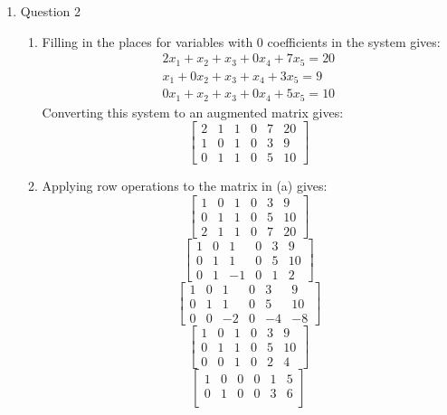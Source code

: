 \documentclass{article}
\begin{document}
\begin{enumerate}
    \newpage 
    \item Question 2
    \begin{enumerate}
        \item Filling in the places for variables with 0 coefficients in the system gives:
        \begin{align*}
            2x_1 + x_2 + x_3 + 0x_4 + 7x_5 = 20 \\
            x_1 + 0x_2 + x_3 + x_4 + 3x_5 = 9 \\
            0x_1 + x_2 + x_3 + 0x_4 + 5x_5 = 10
        \end{align*}
        Converting this system to an augmented matrix gives:
        $$\begin{bmatrix}
            2 & 1 & 1 & 0 & 7 & 20 \\
            1 & 0 & 1 & 0 & 3 & 9 \\
            0 & 1 & 1 & 0 & 5 & 10
        \end{bmatrix}$$
        \item Applying row operations to the matrix in (a) gives:
        $$\begin{bmatrix}
            1 & 0 & 1 & 0 & 3 & 9 \\
            0 & 1 & 1 & 0 & 5 & 10 \\
            2 & 1 & 1 & 0 & 7 & 20
        \end{bmatrix}$$
        $$\begin{bmatrix}
            1 & 0 & 1 & 0 & 3 & 9 \\
            0 & 1 & 1 & 0 & 5 & 10 \\
            0 & 1 & -1 & 0 & 1 & 2
        \end{bmatrix}$$
        $$\begin{bmatrix}
            1 & 0 & 1 & 0 & 3 & 9 \\
            0 & 1 & 1 & 0 & 5 & 10 \\
            0 & 0 & -2 & 0 & -4 & -8
        \end{bmatrix}$$
        $$\begin{bmatrix}
            1 & 0 & 1 & 0 & 3 & 9 \\
            0 & 1 & 1 & 0 & 5 & 10 \\
            0 & 0 & 1 & 0 & 2 & 4
        \end{bmatrix}$$
        $$\begin{bmatrix}
            1 & 0 & 0 & 0 & 1 & 5 \\
            0 & 1 & 0 & 0 & 3 & 6 \\

\end{bmatrix}$$
\end{enumerate}
\end{enumerate}
\end{document}
